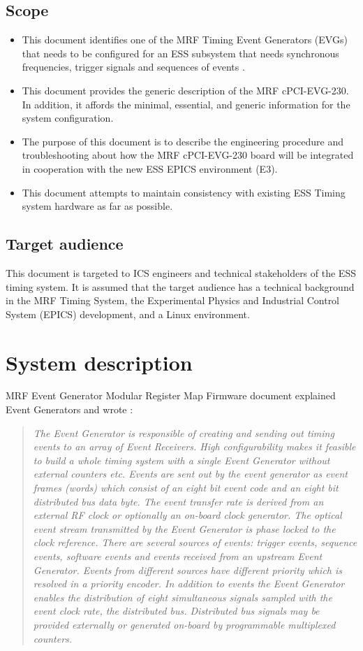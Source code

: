 \documentclass[11pt
  , a4paper
  , article
  , oneside
  , showtrims
]{memoir}
\begin{document}
\section{Scope}
\begin{itemize}
\item This document identifies one of the MRF Timing Event Generators (EVGs) that needs to be configured for an ESS subsystem that needs synchronous frequencies, trigger signals and sequences of events \cite{MRFEVENTGENERATOR}.
\item This document provides the generic description of the MRF cPCI-EVG-230. In addition, it affords the minimal, essential, and generic information for the system configuration.
\item The purpose of this document is to describe the engineering procedure and troubleshooting about how the MRF cPCI-EVG-230 board will be integrated in cooperation with the new ESS EPICS environment (E3).
\item This document attempts to maintain consistency with existing ESS Timing system hardware as far as possible.
\end{itemize}

\section{Target audience}
This document is targeted to ICS engineers and technical stakeholders of the ESS timing system. It is assumed that the target audience has a technical background in the MRF Timing System, the Experimental Physics and Industrial Control System (EPICS) development, and a Linux environment.

\chapter{System description}
MRF Event Generator Modular Register Map Firmware document \citep[see][p4]{MRFEVENTGENERATOR} explained Event Generators and wrote :
\blockquote{\textit{The Event Generator is responsible of creating and sending out timing events to an array of Event Receivers.
High configurability makes it feasible to build a whole timing system with a single Event Generator without external counters etc.
Events are sent out by the event generator as event frames (words) which consist of an eight bit event code and an eight bit distributed bus data byte. The event transfer rate is derived from an external RF clock or optionally an on-board clock generator. The optical event stream transmitted by the Event Generator is phase locked to the clock reference.
There are several sources of events: trigger events, sequence events, software events and events received from an upstream Event Generator. Events from different sources have different priority which is resolved in a priority encoder.
In addition to events the Event Generator enables the distribution of eight simultaneous signals sampled with the event clock rate, the distributed bus. Distributed bus signals may be provided externally or generated on-board by programmable multiplexed counters.}}
\end{document}
